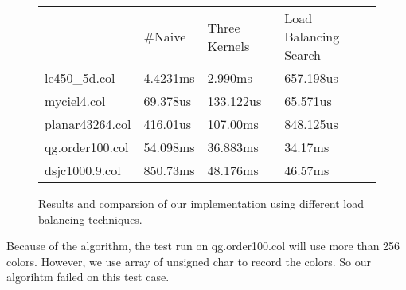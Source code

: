 \documentclass[12pt] {article}
\begin{document}
\begin{figure}[tbh]
 \centering    
\begin{tabular}{ |p{4cm}||p{3cm}|| p{4cm}|p{4cm}|}
 \hline
   & $\#$Naive & Three Kernels &  Load Balancing Search \\ 
     
     \hhline{|=||=|=|=|}
 \hline
 le450\_5d.col & 4.4231ms  & 2.990ms  &657.198us \\
 \hline
 myciel4.col & 69.378us       & 133.122us  &65.571us \\
 \hline
   planar43264.col & 416.01us &  107.00ms & 848.125us\\
 \hline
   qg.order100.col & 54.098ms & 36.883ms   & 34.17ms\\
 \hline
   dsjc1000.9.col & 850.73ms & 48.176ms   &46.57ms \\
 \hline
 
 
\end{tabular} 
\caption{Results and comparsion of our implementation using different load balancing techniques.}
   \label{tab:results}
\end{figure} 

Because of the algorithm, the test run on qg.order100.col will use more than 256 colors. However, we use array of unsigned char to record the colors. So our algorihtm failed on this test case.
\end{document}
